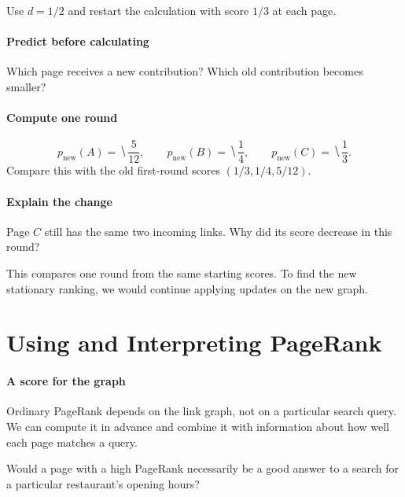\documentclass[11pt]{article}
\begin{document}
Use $d=1/2$ and restart the calculation with score $1/3$ at each page.

\paragraph{Predict before calculating}
Which page receives a new contribution? Which old contribution becomes smaller?
\vs{1cm}

\paragraph{Compute one round}
\begin{equation*}
    p_{\mathrm{new}}(A)=\hide{\frac5{12}},\qquad
    p_{\mathrm{new}}(B)=\hide{\frac14},\qquad
    p_{\mathrm{new}}(C)=\hide{\frac13}.
\end{equation*}
Compare this with the old first-round scores $(1/3,1/4,5/12)$.

\paragraph{Explain the change}
Page $C$ still has the same two incoming links. Why did its score decrease
in this round?
\vs{.8cm}

\vfill
This compares one round from the same starting scores. To find the new
stationary ranking, we would continue applying updates on the new graph.

\newpage
\section{Using and Interpreting PageRank}
\paragraph{A score for the graph}
Ordinary PageRank depends on the link graph, not on a particular search
query. We can compute it in advance and combine it with information about
how well each page matches a query.

Would a page with a high PageRank necessarily be a good answer to a search
for a particular restaurant's opening hours?
\vs{.7cm}
\end{document}
